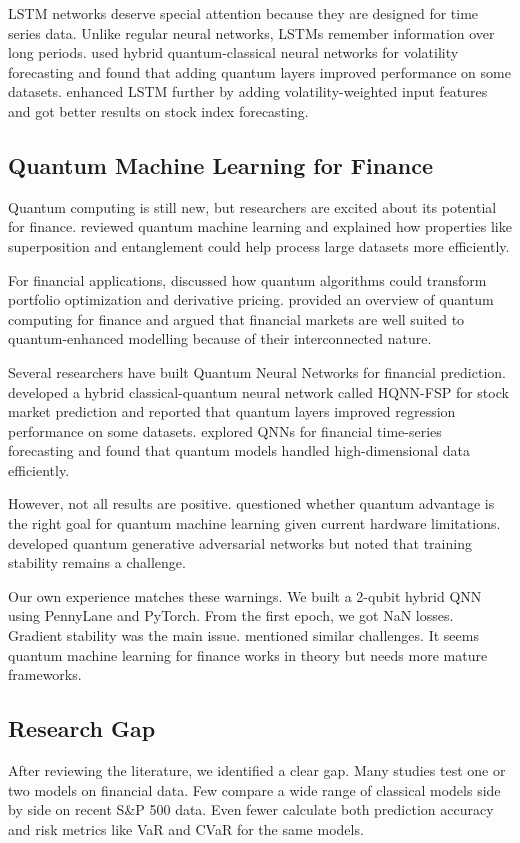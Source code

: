 \documentclass[12pt,a4paper]{article}
\begin{document}
LSTM networks deserve special attention because they are designed for time series data. Unlike regular neural networks, LSTMs remember information over long periods. \citet{li2023} used hybrid quantum-classical neural networks for volatility forecasting and found that adding quantum layers improved performance on some datasets. \citet{abang2025} enhanced LSTM further by adding volatility-weighted input features and got better results on stock index forecasting.

\subsection{Quantum Machine Learning for Finance}
Quantum computing is still new, but researchers are excited about its potential for finance. \citet{biamonte2022} reviewed quantum machine learning and explained how properties like superposition and entanglement could help process large datasets more efficiently.

For financial applications, \citet{cao2022} discussed how quantum algorithms could transform portfolio optimization and derivative pricing. \citet{orus2023} provided an overview of quantum computing for finance and argued that financial markets are well suited to quantum-enhanced modelling because of their interconnected nature.

Several researchers have built Quantum Neural Networks for financial prediction. \citet{chen2025} developed a hybrid classical-quantum neural network called HQNN-FSP for stock market prediction and reported that quantum layers improved regression performance on some datasets. \citet{elalami2025} explored QNNs for financial time-series forecasting and found that quantum models handled high-dimensional data efficiently.

However, not all results are positive. \citet{schuld2022} questioned whether quantum advantage is the right goal for quantum machine learning given current hardware limitations. \citet{zoufal2022} developed quantum generative adversarial networks but noted that training stability remains a challenge.

Our own experience matches these warnings. We built a 2-qubit hybrid QNN using PennyLane and PyTorch. From the first epoch, we got NaN losses. Gradient stability was the main issue. \citet{chen2025} mentioned similar challenges. It seems quantum machine learning for finance works in theory but needs more mature frameworks.

\subsection{Research Gap}
After reviewing the literature, we identified a clear gap. Many studies test one or two models on financial data. Few compare a wide range of classical models side by side on recent S\&P 500 data. Even fewer calculate both prediction accuracy and risk metrics like VaR and CVaR for the same models.
\end{document}
